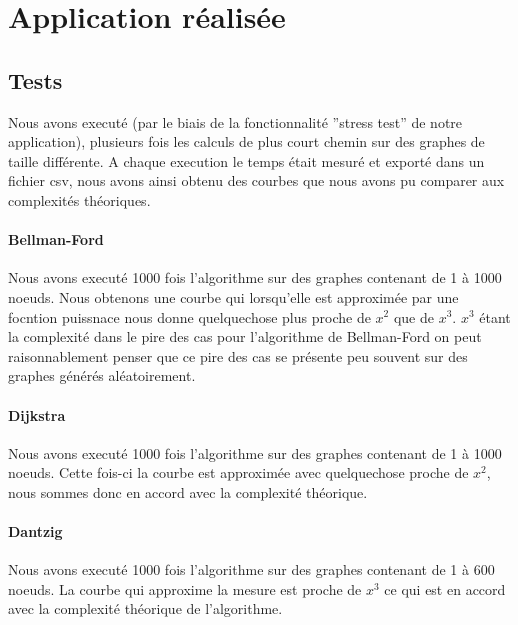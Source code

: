 \documentclass[a4paper,12pt,final] {article}
\begin{document}
\newpage
\section{Application réalisée}
\subsection{Tests}
Nous avons executé (par le biais de la fonctionnalité ''stress test'' de notre application), plusieurs fois les calculs de plus court chemin sur des graphes de taille différente. A chaque execution le temps était mesuré et exporté dans un fichier csv, nous avons ainsi obtenu des courbes que nous avons pu comparer aux complexités théoriques.
\paragraph{Bellman-Ford}
Nous avons executé 1000 fois l'algorithme sur des graphes contenant de 1 à 1000 noeuds.
Nous obtenons une courbe qui lorsqu'elle est approximée par une focntion puissnace nous donne quelquechose plus proche de $x^{2}$ que de $x^{3}$. $x^{3}$ étant la complexité dans le pire des cas pour l'algorithme de Bellman-Ford on peut raisonnablement penser que ce pire des cas se présente peu souvent sur des graphes générés aléatoirement.
\paragraph{Dijkstra}
Nous avons executé 1000 fois l'algorithme sur des graphes contenant de 1 à 1000 noeuds.
Cette fois-ci la courbe est approximée avec quelquechose proche de $x^{2}$, nous sommes donc en accord avec la complexité théorique.
\paragraph{Dantzig}
Nous avons executé 1000 fois l'algorithme sur des graphes contenant de 1 à 600 noeuds.
La courbe qui approxime la mesure est proche de $x^{3}$ ce qui est en accord avec la complexité théorique de l'algorithme.
\end{document}
